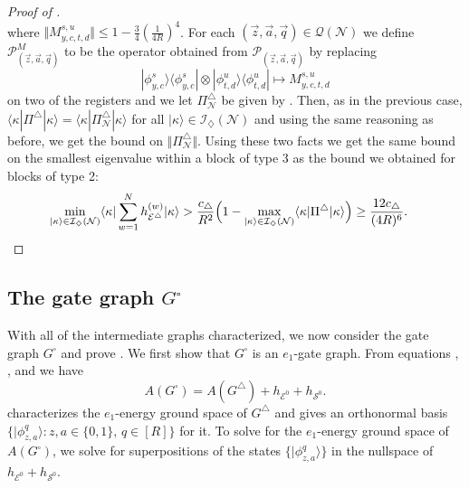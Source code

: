 \documentclass[../thesis-main/thesis-main]{subfiles}
\begin{document}
\begin{proof}[Proof of \protect{}]
\begin{equation}
\end{equation}
where $\Vert M_{y,c,t,d}^{s,u}\Vert \leq1-\frac{3}{4}\left(\frac{1}{4R}\right)^{4}$. For each $(\vec{z},\vec{a},\vec{q})\in\mathcal{Q}(\mathcal{N})$ we define $\mathcal{P}_{(\vec{z},\vec{a},\vec{q})}^{M}$ to be the operator obtained from $\mathcal{P}_{(\vec{z},\vec{a},\vec{q})}$ by replacing
\begin{equation}
|\phi_{y,c}^{s}\rangle\langle\phi_{y,c}^{s}|\otimes|\phi_{t,d}^{u}\rangle\langle\phi_{t,d}^{u}|\mapsto M_{y,c,t,d}^{s,u}
\end{equation}
on two of the registers and we let $\Pi_{\mathcal{N}}^{\triangle}$ be given by . Then, as in the previous case, $\langle\kappa|\Pi^{\triangle}|\kappa\rangle=\langle\kappa|\Pi_{\mathcal{N}}^{\triangle}|\kappa\rangle$ for all $|\kappa\rangle\in\mathcal{I}_{\diamondsuit}(\mathcal{N})$ and using the same reasoning as before, we get the bound  on $\Vert \Pi_{\mathcal{N}}^{\triangle}\Vert $. Using these two facts we get the same bound on the smallest eigenvalue within a block of type 3 as the bound we obtained for blocks of type 2:
\begin{align}
\min_{|\kappa\rangle\in\mathcal{I}_{\diamondsuit}(\mathcal{N})}\langle\kappa|\sum_{w=1}^{N}h_{\mathcal{E}^{\triangle}}^{(w)}|\kappa\rangle &>\frac{c_{\triangle}}{R^{2}}\Big(1-\max_{|\kappa\rangle\in\mathcal{I}_{\diamondsuit}(\mathcal{N})}\langle\kappa|\Pi^{\triangle}|\kappa\rangle\Big) \geq \frac{12c_{\triangle}}{(4R)^6}.\qedhere
\end{align}
\end{proof}

\subsection{The gate graph $G^{\square}$ }

With all of the intermediate graphs characterized, we now consider the gate graph $G^{\square}$ and prove . We first show that $G^{\square}$ is an $e_{1}$-gate graph. From equations , , and  we have
\begin{equation}
A(G^{\square})=A(G^{\triangle})+h_{\mathcal{E}^{0}}+h_{\mathcal{S}^{0}}.\label{eq:A_g_square_triangle}
\end{equation}
 characterizes the $e_{1}$-energy ground space of $G^{\triangle}$ and gives an orthonormal basis $\{|\phi_{z,a}^{q}\rangle\colon z,a\in\{0,1\},\, q\in[R]\}$ for it. To solve for the $e_{1}$-energy ground space of $A(G^{\square})$, we solve for superpositions of the states $\{|\phi_{z,a}^{q}\rangle\}$ in the nullspace of $h_{\mathcal{E}^{0}}+h_{\mathcal{S}^{0}}$.
\end{document}

